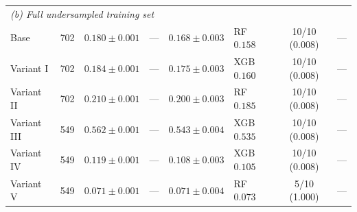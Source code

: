 \begin{table}[htbp]
\begin{tabular}{l r c c c l c c}
\midrule
\multicolumn{8}{l}{\emph{(b) Full undersampled training set}} \\
Base & 702 & $0.180 \pm 0.001$ & --- & $0.168 \pm 0.003$ & RF $0.158$ & 10/10 (0.008) & --- \\
Variant I & 702 & $0.184 \pm 0.001$ & --- & $0.175 \pm 0.003$ & XGB $0.160$ & 10/10 (0.008) & --- \\
Variant II & 702 & $0.210 \pm 0.001$ & --- & $0.200 \pm 0.003$ & RF $0.185$ & 10/10 (0.008) & --- \\
Variant III & 549 & $0.562 \pm 0.001$ & --- & $0.543 \pm 0.004$ & XGB $0.535$ & 10/10 (0.008) & --- \\
Variant IV & 549 & $0.119 \pm 0.001$ & --- & $0.108 \pm 0.003$ & XGB $0.105$ & 10/10 (0.008) & --- \\
Variant V & 549 & $0.071 \pm 0.001$ & --- & $0.071 \pm 0.004$ & RF $0.073$ & 5/10 (1.000) & --- \\
\bottomrule
\end{tabular}
\end{table}
